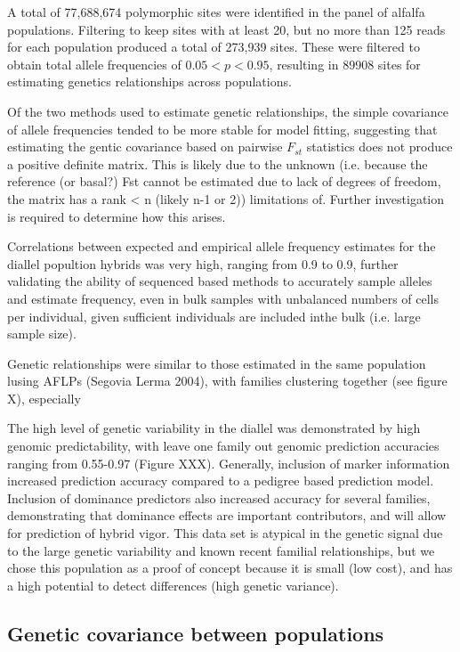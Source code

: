 \documentclass[12pt, letterpaper]{article}
\begin{document}
	A total of 77,688,674 polymorphic sites were identified in the panel of alfalfa populations. Filtering to keep sites with at least 20, but no more than 125 reads for each population produced a total of 273,939 sites. These were filtered to obtain total allele frequencies of $0.05 < p < 0.95$, resulting in 89908 sites for estimating genetics relationships across populations.

	Of the two methods used to estimate genetic relationships, the simple covariance of allele frequencies tended to be more stable for model fitting, suggesting that estimating the gentic covariance based on pairwise $F_{st}$ statistics does not produce a positive definite matrix. This is likely due to the unknown (i.e. because the reference (or basal?)  Fst cannot be estimated due to lack of degrees of freedom, the matrix has a rank < n (likely n-1 or 2)) limitations of. Further investigation is required to determine how this arises. 

	Correlations between expected and empirical allele frequency estimates for the diallel popultion hybrids was very high, ranging from 0.9 to 0.9, further validating the ability of sequenced based methods to accurately sample alleles and estimate frequency, even in bulk samples with unbalanced numbers of cells per individual, given sufficient individuals are included inthe bulk (i.e. large sample size).

	Genetic relationships were similar to those estimated in the same population lusing AFLPs (Segovia Lerma 2004), with families clustering together (see figure X), especially 



The high level of genetic variability in the diallel was demonstrated by high genomic predictability, with leave one family out genomic prediction accuracies ranging from 0.55-0.97 (Figure XXX). Generally, inclusion of marker information increased prediction accuracy compared to a pedigree based prediction model. Inclusion of dominance predictors also increased accuracy for several families, demonstrating that dominance effects are important contributors, and will allow for prediction of hybrid vigor. This data set is atypical in the genetic signal due to the large genetic variability and known recent familial relationships, but we chose this population as a proof of concept because it is small (low cost), and has a high potential to detect differences (high genetic variance). 




\subsection{Genetic covariance between populations}
\end{document}
